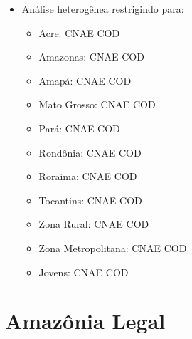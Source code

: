\documentclass[8pt]{beamer}
\begin{document}
\begin{frame}[label=indice_principal]{}
\begin{itemize}
\item{Análise heterogênea restrigindo para:
	\begin{itemize}
	\item{Acre: CNAE	\hyperlink{amzaccnae2dig}{} COD 	\hyperlink{amzaccod2dig}{}}
	\item{Amazonas: CNAE	\hyperlink{amzamcnae2dig}{} COD 	\hyperlink{amzamcod2dig}{}}
	\item{Amapá: CNAE	\hyperlink{amzapcnae2dig}{} COD 	\hyperlink{amzapcod2dig}{}}
	\item{Mato Grosso: CNAE	\hyperlink{amzmtcnae2dig}{} COD 	\hyperlink{amzmtcod2dig}{}}
	\item{Pará: CNAE	\hyperlink{amzpacnae2dig}{} COD 	\hyperlink{amzpacod2dig}{}}
	\item{Rondônia: CNAE	\hyperlink{amzrocnae2dig}{} COD 	\hyperlink{amzrocod2dig}{}}
	\item{Roraima: CNAE	\hyperlink{amzrrcnae2dig}{} COD 	\hyperlink{amzrrcod2dig}{}}
	\item{Tocantins: CNAE	\hyperlink{amztocnae2dig}{} COD 	\hyperlink{amztocod2dig}{}}
	\item{Zona Rural: CNAE	\hyperlink{amzruralcnae2dig}{} COD 	\hyperlink{amzruralcod2dig}{}}
	\item{Zona Metropolitana: CNAE	\hyperlink{amzmetropolitanacnae2dig}{} COD 	\hyperlink{amzmetropolitanacod2dig}{}}
	\item{Jovens: CNAE	\hyperlink{amzjovemcnae2dig}{} COD 	\hyperlink{amzjovemcod2dig}{}}
	\vspace{1mm}
	\end{itemize}
}

\end{itemize}

\end{frame}


\section{Amazônia Legal}

\begin{frame}[label=amzcod2dig]{}
\textit{\hyperlink{indice_principal}{}}

\end{frame}
\end{document}
